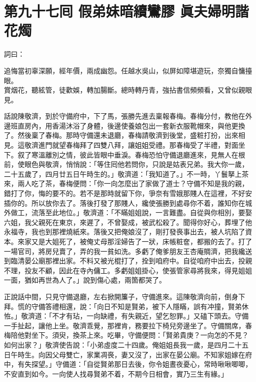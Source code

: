 
\chapter*{第九十七囘 假弟妹暗續鸞膠 眞夫婦明諧花燭}


詞曰：

\begin{myquote}
追悔當初辜深願，經年價，兩成幽怨。任越水吳山，似屏如障堪遊玩，奈獨自慵擡眼。\\賞烟花，聽絃管，徒歡娛，轉加腸斷。總時轉丹青，強拈書信頻頻看，又曾似親眼見。
\end{myquote}

話說陳敬濟，到於守備府中，下了馬，張勝先進去稟報春梅。春梅分付，教他在外邊班直房內，用香湯沐浴了身體，後邊使養娘包出一套新衣服靴帽來，與他更換了。然後稟了春梅。那時守備還未退廳，春梅請敬濟到後堂，盛粧打扮，出來相見。這敬濟進門就望春梅拜了四雙八拜，讓姐姐受禮。那春梅受了半禮，對面坐下。叙了寒溫離別之情，彼此皆眼中垂淚。春梅恐怕守備退廳進來，見無人在根前，使眼色與敬濟，{}悄悄說：「等住囘他若問你，只說是姑表兄弟。我大你一歲，二十五歲了，四月廿五日午時生的。」敬濟道：「我知道了。」不一時，丫鬟拏上茶來，兩人吃了茶，春梅便問：「你一向怎麼出了家做了道士？守備不知是我的親，錯打了你，悔的要不的。若不是那時就留下你，爭奈有雪娥那賤人在這裡，不好安插你的。{}所以放你去了。落後打發了那賤人，纔使張勝到處尋你不着，誰知你在城外做工，流落至此地位。」敬濟道：「不瞞姐姐說，一言難盡。自從與你相別，要娶六姐，我父親死在東京，來遲了，不曾娶成，被武松殺了。聞得你好心，葬埋了他永福寺，我也到那裡燒紙來。落後又把俺娘沒了，剛打發䘮事出去，被人坑陷了資本。{}來家又是大姐死了，被俺丈母那淫婦告了一狀，{}床帳粧奩，都搬的去了。打了一場官司，將房兒賣了，弄的我一貧如洗。多虧了俺爹朋友王杏庵賙濟，把我纔送到臨清晏公廟那裡出家。不料又被光棍打了，拴到咱府中。自從咱府中出去，投親不理，投友不顧，因此在寺內傭工。多虧姐姐掛心，使張管家尋將我來，得見姐姐一面，猶如再世為人了。」{}說到傷心處，兩箇都哭了。

正說話中間，只見守備退廳，左右掀開簾子，守備進來。這陳敬濟向前，倒身下拜。慌的守備答禮相還，說：「向日不知是賢弟，被下人隱瞞，誤有冲撞，賢弟休恠。」敬濟道：「不才有玷，一向缺禮，有失親近，望乞恕罪。」又磕下頭去。守備一手扯起，讓他上坐。敬濟乖覺，那裡肯，務要拉下椅兒旁邊坐了。守備關席，春梅陪他對坐下。須臾，換茶上來。吃畢，守備便問：「賢弟貴庚？一向怎的不見？如何出家？」敬濟使告說：「小弟虛度二十四歲。俺姐姐長我一歲，是四月二十五日午時生。向因父母雙亡，家業凋䘮，妻又沒了，出家在晏公廟。不知家姐嫁在府中，有失探望。」守備道：「自從賢弟那日去後，你令姐晝夜憂心，常時啾啾唧唧，不安直到如今。{}一向使人找尋賢弟不着，不期今日相會，實乃三生有緣。」

